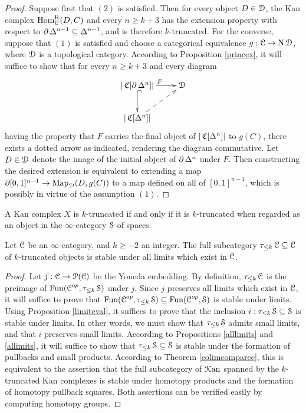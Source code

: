 \begin{proof}
Suppose first that $(2)$ is satisfied. Then for every object $D \in \operatorname{\mathcal{D}}$, the Kan complex
$\operatorname{Hom}^{\operatorname{R}}_{\operatorname{\mathcal{C}}}(D,C)$ and every $n \geq k+3$
has the extension property with respect to $\operatorname{\partial} \Delta^{n-1} \subseteq \Delta^{n-1}$, and is therefore $k$-truncated. For the converse, suppose that $(1)$ is satisfied and choose a categorical equivalence $g: \operatorname{\mathcal{C}} \rightarrow \operatorname{N} \operatorname{\mathcal{D}}$, where $\operatorname{\mathcal{D}}$ is a topological category.
According to Proposition \ref{princex}, it will suffice to show that for every $n \geq k+3$ and every diagram $$ \xymatrix{ | \sCoNerve[\bd \Delta^n] | \ar@{^{(}->}[d] \ar[r]^{F} & \calD \\
| \sCoNerve[\Delta^n] | \ar@{-->}[ur], & }$$
having the property that $F$ carries the final object of $| \operatorname{\mathfrak{C}}[\Delta^n] |$ to
$g(C)$, there exists a dotted arrow as indicated, rendering the diagram commutative. Let $D \in \operatorname{\mathcal{D}}$ denote the image of the initial object of $\operatorname{\partial} \Delta^n$ under $F$. Then constructing the desired extension is equivalent to extending a map $\operatorname{\partial} [0,1]^{n-1} \rightarrow \operatorname{{Map}}_{\operatorname{\mathcal{D}}}( D, g(C))$ to a map defined on all of $[0,1]^{n-1}$, which is possibly in virtue of the assumption $(1)$.
\end{proof}

\begin{remark}\label{humpter}
A Kan complex $X$ is $k$-truncated if and only if it is $k$-truncated when regarded as an object in the $\infty$-category $\operatorname{\mathcal{S}}$ of spaces.
\end{remark}

\begin{proposition}\label{altum}
Let $\operatorname{\mathcal{C}}$ be an $\infty$-category, and $k \geq -2$ an integer. The full subcategory
$\tau_{\leq k} \operatorname{\mathcal{C}} \subseteq \operatorname{\mathcal{C}}$ of $k$-truncated objects is stable under all limits
which exist in $\operatorname{\mathcal{C}}$.
\end{proposition}

\begin{proof}
Let $j: \operatorname{\mathcal{C}} \rightarrow \operatorname{\mathcal{P}}(\operatorname{\mathcal{C}})$ be the Yoneda embedding. By definition,
$\tau_{\leq k} \operatorname{\mathcal{C}}$ is the preimage of $\operatorname{Fun}(\operatorname{\mathcal{C}}^{op}, \tau_{\leq k} \operatorname{\mathcal{S}})$ under
$j$. Since $j$ preserves all limits which exist in $\operatorname{\mathcal{C}}$, it will suffice to prove that
$\operatorname{Fun}(\operatorname{\mathcal{C}}^{op},\tau_{\leq k} \operatorname{\mathcal{S}}) \subseteq \operatorname{Fun}(\operatorname{\mathcal{C}}^{op},\operatorname{\mathcal{S}})$ is stable under limits.
Using Proposition \ref{limiteval}, it suffices to prove that the inclusion $i: \tau_{\leq k} \operatorname{\mathcal{S}} \subseteq \operatorname{\mathcal{S}}$ is stable under limits. In other words, we must show that $\tau_{\leq k} \operatorname{\mathcal{S}}$
admits small limits, and that $i$ preserves small limits. According to Propositions \ref{alllimits} and \ref{allimits}, it will suffice to show that $\tau_{\leq k} \operatorname{\mathcal{S}} \subseteq \operatorname{\mathcal{S}}$ is stable
under the formation of pullbacks and small products. According to Theorem \ref{colimcomparee}, this is equivalent to the assertion that the full subcategory of $\operatorname{\mathcal{K}an}$ spanned by the $k$-truncated Kan complexes is stable under homotopy products and the formation of homotopy pullback squares. Both assertions can be verified easily by computing homotopy groups.
\end{proof}

